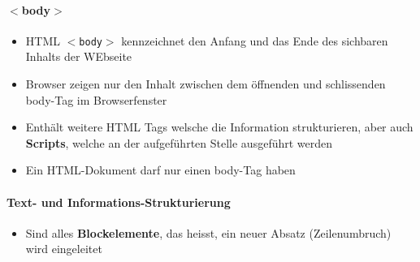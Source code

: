 \paragraph{$<$body$>$}
\begin{itemize}[noitemsep,topsep=0pt,leftmargin=*]
    \item HTML \texttt{$<$body$>$} kennzeichnet den Anfang und das Ende des sichbaren Inhalts der WEbseite
    \item Browser zeigen nur den Inhalt zwischen dem öffnenden und schlissenden body-Tag im Browserfenster
    \item Enthält weitere HTML Tags welsche die Information strukturieren, aber auch \textbf{Scripts}, welche an der aufgeführten Stelle ausgeführt werden
    \item Ein HTML-Dokument darf nur einen body-Tag haben
\end{itemize}

\paragraph{Text- und Informations-Strukturierung}
\begin{itemize}[noitemsep,topsep=0pt,leftmargin=*]
    \item Sind alles \textbf{Blockelemente}, das heisst, ein neuer Absatz (Zeilenumbruch) wird eingeleitet
\end{itemize}


